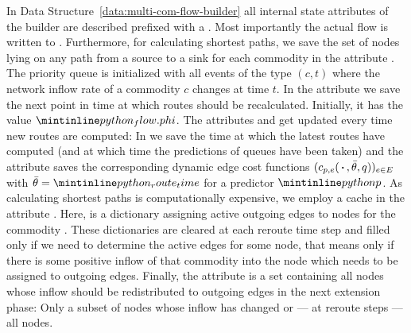 In Data Structure~\ref{data:multi-com-flow-builder} all internal state attributes of the builder are described prefixed with a \code{_}.
Most importantly the actual flow is written to .
Furthermore, for calculating shortest paths, we save the set of nodes lying on any path from a source to a sink for each commodity in the attribute . 
The priority queue  is initialized with all events of the type $(c, t)$ where the network inflow rate of a commodity $c$ changes at time $t$.
In the attribute  we save the next point in time at which routes should be recalculated.
Initially, it has the value $\code{_flow.phi}$.
The attributes  and  get updated every time new routes are computed:
In  we save the time at which the latest routes have computed (and at which time the predictions of queues have been taken) and the attribute  saves the corresponding dynamic edge cost functions $(c_{p,e}(\,\boldsymbol{\cdot}\,, \bar\theta, q))_{e\in E}$ with $\bar\theta = \code{_route_time}$ for a predictor $\code{p}$.
As calculating shortest paths is computationally expensive, we employ a cache in the attribute .
Here,  is a dictionary assigning active outgoing edges to nodes for the commodity .
These dictionaries are cleared at each reroute time step and filled only if we need to determine the active edges for some node, that means only if there is some positive inflow of that commodity into the node which needs to be assigned to outgoing edges.
Finally, the attribute  is a set containing all nodes whose inflow should be redistributed to outgoing edges in the next extension phase: Only a subset of nodes whose inflow has changed or — at reroute steps — all nodes.
 
